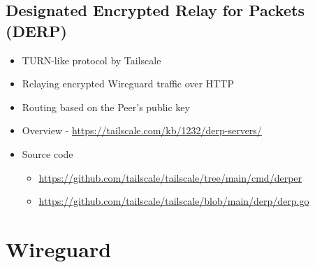\hypertarget{designated-encrypted-relay-for-packets-derp}{%
\subsection{Designated Encrypted Relay for Packets
(DERP)}\label{designated-encrypted-relay-for-packets-derp}}

\begin{itemize}
\tightlist
\item
  TURN-like protocol by Tailscale
\item
  Relaying encrypted Wireguard traffic over HTTP
\item
  Routing based on the Peer's public key
\item
  Overview - \url{https://tailscale.com/kb/1232/derp-servers/}
\item
  Source code

  \begin{itemize}
  \tightlist
  \item
    \url{https://github.com/tailscale/tailscale/tree/main/cmd/derper}
  \item
    \url{https://github.com/tailscale/tailscale/blob/main/derp/derp.go}
  \end{itemize}
\end{itemize}

\hypertarget{wireguard}{%
\section{Wireguard}\label{wireguard}}

